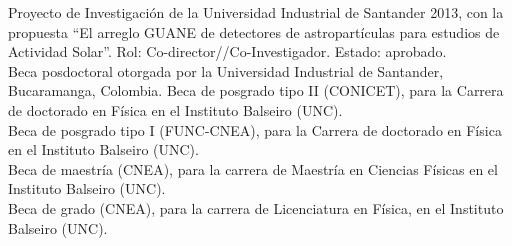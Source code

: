  Proyecto de Investigación de la Universidad Industrial de Santander 2013, con la propuesta ``El arreglo GUANE de detectores de astropartículas para estudios de Actividad Solar''. Rol: Co-director//Co-Investigador. Estado: aprobado.\\
 Beca posdoctoral otorgada por la Universidad Industrial de Santander, Bucaramanga, Colombia.
 Beca de posgrado tipo II (CONICET), para la Carrera de doctorado en Física en el Instituto Balseiro (UNC).\\
 Beca de posgrado tipo I (FUNC-CNEA), para la Carrera de doctorado en Física en el Instituto Balseiro (UNC).\\
 Beca de maestría (CNEA), para la carrera de Maestría en Ciencias Físicas en el Instituto Balseiro (UNC).\\
 Beca de grado (CNEA), para la carrera de Licenciatura en Física, en el Instituto Balseiro (UNC).\\
\fi
\fi